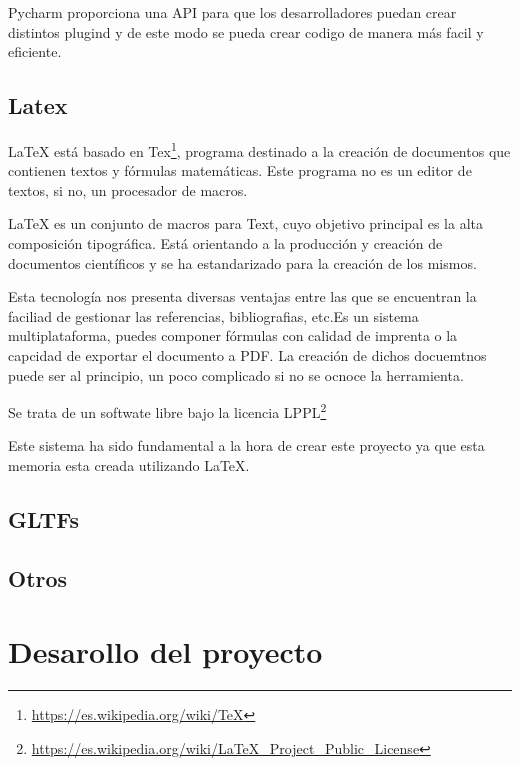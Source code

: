 \documentclass[a4paper, 12pt]{book}
\begin{document}
Pycharm proporciona una API para que los desarrolladores puedan crear distintos plugind y de este modo se pueda crear codigo de manera más facil y eficiente.

\section{Latex} %
\label{sec:Latex}
LaTeX está basado en Tex\footnote{\url{https://es.wikipedia.org/wiki/TeX}}, programa destinado a la creación de documentos que contienen textos y fórmulas matemáticas. Este programa no es un editor de textos, si no, un procesador de macros.

LaTeX es un conjunto de macros para Text, cuyo objetivo principal es la alta composición tipográfica. Está orientando a la producción y creación de documentos científicos y se ha estandarizado para la creación de los mismos.

Esta tecnología nos presenta diversas ventajas entre las que se encuentran la faciliad de gestionar las referencias, bibliografias, etc.Es un sistema multiplataforma, puedes componer fórmulas con calidad de imprenta o la capcidad de exportar el documento a PDF. La creación de dichos docuemtnos puede ser al principio, un poco complicado si no se ocnoce la herramienta.

Se trata de un softwate libre bajo la licencia LPPL\footnote{\url{https://es.wikipedia.org/wiki/LaTeX_Project_Public_License}} 

Este sistema ha sido fundamental a la hora de crear este proyecto ya que esta memoria esta creada utilizando LaTeX.


\section{GLTFs} %
\label{sec:gltfs}
\section{Otros} %
\label{sec:Otros}

\cleardoublepage
\chapter{Desarollo del proyecto}
\label{chap:estado}
\end{document}
